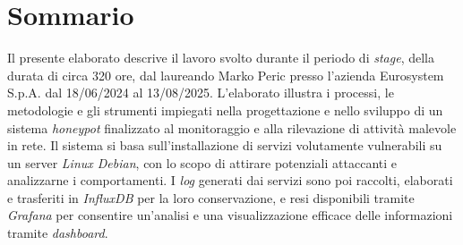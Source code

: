 \cleardoublepage
{}
{}
\begingroup
\let\clearpage\relax
\let\cleardoublepage\relax
\chapter*{Sommario}
Il presente elaborato descrive il lavoro svolto durante il periodo di \textit{stage}, della durata di circa
320 ore, dal laureando Marko Peric presso l'azienda Eurosystem S.p.A. dal 18/06/2024 al
13/08/2025.
L'elaborato illustra i processi, le metodologie e gli strumenti impiegati nella progettazione e nello sviluppo di un sistema \textit{honeypot} finalizzato al monitoraggio e alla rilevazione di attività malevole in rete. Il sistema si basa sull'installazione di servizi volutamente vulnerabili su un server \textit{Linux Debian}, con lo scopo di attirare potenziali attaccanti e analizzarne i comportamenti. I \textit{log} generati dai servizi sono poi raccolti, elaborati e trasferiti in \textit{InfluxDB} per la loro conservazione, e resi disponibili tramite \textit{Grafana} per consentire un'analisi e una visualizzazione efficace delle informazioni tramite \textit{dashboard}.
